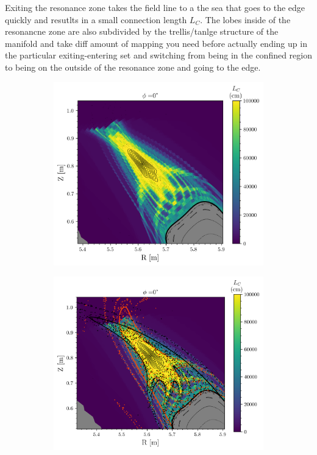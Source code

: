 Exiting the resonance zone takes the field line to a the sea that goes to the edge quickly and resutlts in a small connection length $L_C$. The lobes inside of the resonancne zone are also subdivided by the trellis/tanlge structure of the manifold and take diff amount of mapping you need before actually ending up in the particular exiting-entering set and switching from being in the confined region to being on the outside of the resonance zone and going to the edge.

\begin{figure}[H]
    \centering
    \begin{subfigure}[c]{0.48\textwidth}
        \centering
        \includegraphics[width=\textwidth]{images/w7x-gym00-1750/gym00_1750_cnpoints.png}
        \caption{}
        \label{fig:cl-a}
    \end{subfigure}
    \begin{subfigure}[c]{0.5\textwidth}
        \centering
        \includegraphics[width=\textwidth]{images/w7x-gym00-1750/gym00_1750_points.png}

\end{subfigure}
\end{figure}
